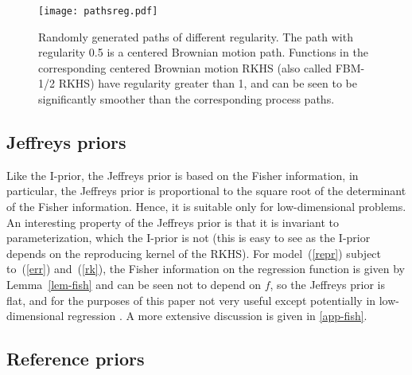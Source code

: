 \documentclass[preprint,12pt,authoryear]{elsarticle}
\begin{document}
\begin{figure}[tbp]
	\centering  
	\texttt{[image: pathsreg.pdf]}
	\caption{Randomly generated paths of different regularity. The path with regularity 0.5 is a centered Brownian motion path. Functions in the corresponding centered Brownian motion RKHS (also called FBM-1/2 RKHS) have regularity greater than 1, and can be seen to be significantly smoother than the corresponding process paths.}
	\label{fig-pathsreg}
\end{figure}







\subsection{Jeffreys priors}

Like the I-prior, the Jeffreys prior is based on the Fisher information, in particular, the Jeffreys prior is proportional to the square root of the determinant of the Fisher information. Hence, it is suitable only for low-dimensional problems. An interesting property of the Jeffreys prior is that it is invariant to parameterization, which the I-prior is not (this is easy to see as the I-prior depends on the reproducing kernel of the RKHS). For model~(\ref{repr}) subject to~(\ref{err}) and~(\ref{rk}), the Fisher information on the regression function is given by Lemma~\ref{lem-fish} and can be seen not to depend on $f$, so the Jeffreys prior is flat, and for the purposes of this paper not very useful except potentially in low-dimensional regression \citep[e.g.][]{il91}. A more extensive discussion is given in \ref{app-fish}.



\subsection{Reference priors}
\end{document}
